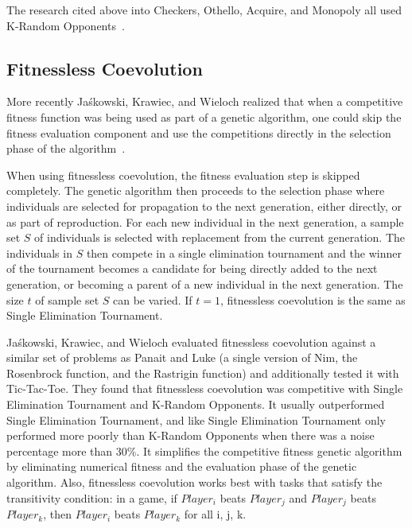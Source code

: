 The research cited above into Checkers, Othello, Acquire, and Monopoly all used
K-Random
Opponents~\cite{Fogel2000Anaconda,journals/tec/ChellapillaF01,ChongTW05,Anthony2002,DBLP:conf/cig/Frayn05}.

\subsection{Fitnessless Coevolution}

More recently Ja\'{s}kowski, Krawiec, and Wieloch realized that when a
competitive fitness function was being used as part of a genetic algorithm, one
could skip the fitness evaluation component and use the competitions directly in the
selection phase of the algorithm~\cite{Jaskowski:2008:FC:1389095.1389161}. 

When using fitnessless coevolution, the fitness evaluation step is skipped
completely. The genetic algorithm then proceeds to the selection phase where
individuals are selected for propagation to the next generation, either
directly, or as part of reproduction. For each new individual in the next
generation, a sample set \(S\) of individuals is selected with replacement from
the current generation. The individuals in \(S\) then compete in a single
elimination tournament and the winner of the tournament becomes a candidate for
being directly added to the next generation, or becoming a parent of a new
individual in the next generation. The size \(t\) of sample set \(S\) can be
varied. If \(t=1\), fitnessless coevolution is the same as Single
Elimination Tournament.

Ja\'{s}kowski, Krawiec, and Wieloch evaluated fitnessless coevolution against a
similar set of problems as Panait and Luke (a single version of Nim, the
Rosenbrock function, and the Rastrigin function) and additionally tested it with
Tic-Tac-Toe. They found that fitnessless coevolution was competitive with Single
Elimination Tournament and K-Random Opponents. It usually outperformed Single
Elimination Tournament, and like Single Elimination Tournament only performed
more poorly than K-Random Opponents when there was a noise percentage more than
30\%. It simplifies the competitive fitness genetic algorithm by eliminating
numerical fitness and the evaluation phase of the genetic algorithm. Also,
fitnessless coevolution works best with tasks that satisfy the transitivity
condition: in a game, if \(Player_{i}\) beats \(Player_{j}\) and \(Player_{j}\)
beats \(Player_{k}\), then \(Player_{i}\) beats \(Player_{k}\) for all i, j, k.

